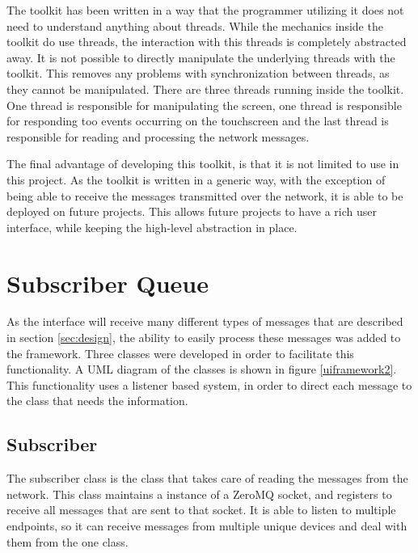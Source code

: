 The toolkit has been written in a way that the programmer utilizing it does not need to understand anything about threads. While the mechanics inside the toolkit do use threads, the interaction with this threads is completely abstracted away. It is not possible to directly manipulate the underlying threads with the toolkit. This removes any problems with synchronization between threads, as they cannot be manipulated. There are three threads running inside the toolkit. One thread is responsible for manipulating the screen, one thread is responsible for responding too events occurring on the touchscreen  and the last thread is responsible for reading and processing the network messages.

The final advantage of developing this toolkit, is that it is not limited to use in this project. As the toolkit is written in a generic way, with the exception of being able to receive the messages transmitted over the network, it is able to be deployed on future projects. This allows future projects to have a rich user interface, while keeping the high-level abstraction in place.



\section{Subscriber Queue}

As the interface will receive many different types of messages that are described in section \ref{sec:design}, the ability to easily process these messages was added to the framework. Three classes were developed in order to facilitate this functionality. A UML diagram of the classes is shown in figure \ref{uiframework2}. This functionality uses a listener based system, in order to direct each message to the class that needs the information.


\subsection{Subscriber}

The subscriber class is the class that takes care of reading the messages from the network. This class maintains a instance of a ZeroMQ socket, and registers to receive all messages that are sent to that socket. It is able to listen to multiple endpoints, so it can receive messages from multiple unique devices and deal with them from the one class.

